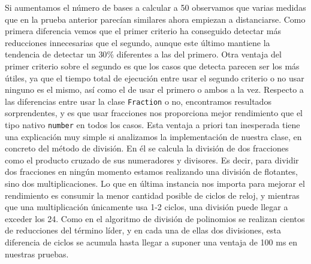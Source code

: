 Si aumentamos el número de bases a calcular a 50 observamos que varias medidas que en la prueba anterior parecían similares ahora empiezan a distanciarse. Como primera diferencia vemos que el primer criterio ha conseguido detectar más reducciones innecesarias que el segundo, aunque este último mantiene la tendencia de detectar un $30\%$ diferentes a las del primero. Otra ventaja del primer criterio sobre el segundo es que los casos que detecta parecen ser los más útiles, ya que el tiempo total de ejecución entre usar el segundo criterio o no usar ninguno es el mismo, así como el de usar el primero o ambos a la vez. Respecto a las diferencias entre usar la clase \texttt{Fraction} o no, encontramos resultados sorprendentes, y es que usar fracciones nos proporciona mejor rendimiento que el tipo nativo \texttt{number} en todos los casos. Esta ventaja a priori tan inesperada tiene una explicación muy simple si analizamos la implementación de nuestra clase, en concreto del método de división. En él se calcula la división de dos fracciones como el producto cruzado de sus numeradores y divisores. Es decir, para dividir dos fracciones en ningún momento estamos realizando una división de flotantes, sino dos multiplicaciones. Lo que en última instancia nos importa para mejorar el rendimiento es consumir la menor cantidad posible de ciclos de reloj, y mientras que una multiplicación únicamente usa 1-2 ciclos, una división puede llegar a exceder los 24. Como en el algoritmo de división de polinomios se realizan cientos de reducciones del término líder, y en cada una de ellas dos divisiones, esta diferencia de ciclos se acumula hasta llegar a suponer una ventaja de 100 ms en nuestras pruebas.  \newline


